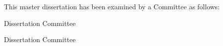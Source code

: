 \begin{titlepage}
\begin{large}
This master dissertation has been examined by a Committee as follows:

\signature{Alex Sandro Gomes}{Dissertation Committee \\
  \ufpe}

\signature{João Marcelo Xavier Natário Teixeira}{Dissertation Committee \\
   \ufrpe}


\end{large}
\end{titlepage}

